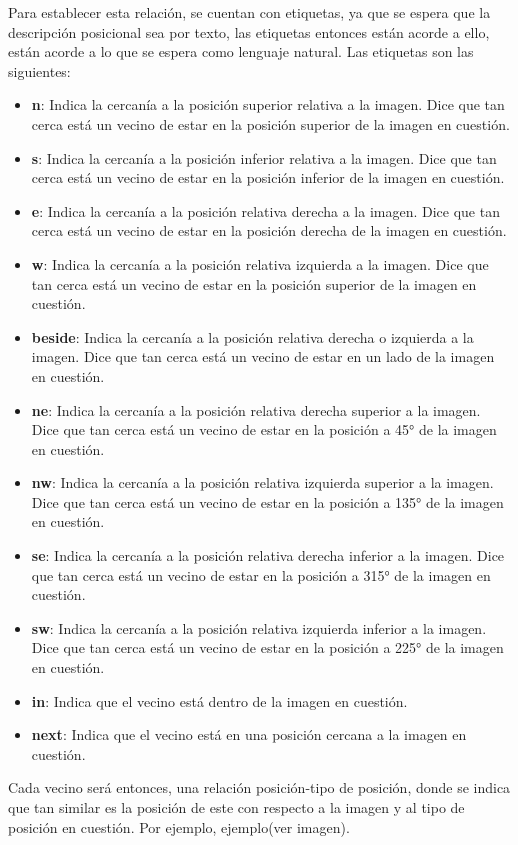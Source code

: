 Para establecer esta relación, se cuentan con etiquetas, ya que se espera que la descripción posicional sea por texto, las etiquetas entonces están acorde a ello, están acorde a lo que se espera como lenguaje natural. Las etiquetas son las siguientes:
\begin{itemize}
 
    \item \textbf{n}: Indica la cercanía a la posición superior relativa a la imagen. Dice que tan cerca está un vecino de estar en la posición superior de la imagen en cuestión.
    \item \textbf{s}: Indica la cercanía a la posición inferior relativa a la imagen. Dice que tan cerca está un vecino de estar en la posición inferior de la imagen en cuestión.
    \item \textbf{e}: Indica la cercanía a la posición relativa derecha a la imagen. Dice que tan cerca está un vecino de estar en la posición derecha de la imagen en cuestión.
    \item \textbf{w}: Indica la cercanía a la posición relativa izquierda a la imagen. Dice que tan cerca está un vecino de estar en la posición superior de la imagen en cuestión.
    \item \textbf{beside}: Indica la cercanía a la posición relativa derecha o izquierda a la imagen. Dice que tan cerca está un vecino de estar en un lado de la imagen en cuestión.
    \item \textbf{ne}: Indica la cercanía a la posición relativa derecha superior a la imagen. Dice que tan cerca está un vecino de estar en la posición a 45° de la imagen en cuestión.
    \item \textbf{nw}: Indica la cercanía a la posición relativa izquierda superior a la imagen. Dice que tan cerca está un vecino de estar en la posición a 135° de la imagen en cuestión.
    \item \textbf{se}: Indica la cercanía a la posición relativa derecha inferior a la imagen. Dice que tan cerca está un vecino de estar en la posición a 315° de la imagen en cuestión.
    \item \textbf{sw}: Indica la cercanía a la posición relativa izquierda inferior a la imagen. Dice que tan cerca está un vecino de estar en la posición a 225° de la imagen en cuestión.
    \item \textbf{in}: Indica que el vecino está dentro de la imagen en cuestión.
    \item \textbf{next}: Indica que el vecino está en una posición cercana a la imagen en cuestión.
\end{itemize}
Cada vecino será entonces, una relación posición-tipo de posición, donde se indica que tan similar es la posición de este con respecto a la imagen y al tipo de posición en cuestión. Por ejemplo, ejemplo(ver imagen).

